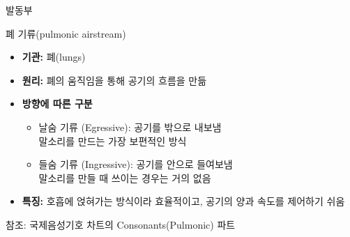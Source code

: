 \documentclass[11pt, aspectratio=169]{beamer}
\begin{document}
\begin{frame}[t]{발동부}
    \begin{block}{폐 기류(pulmonic airstream)}
        \begin{itemize}
            \item \textbf{기관:} 폐(lungs)
            \item \textbf{원리:} 폐의 움직임을 통해 공기의 흐름을 만듦
            \item \textbf{방향에 따른 구분}
                \begin{itemize}
                    \item 날숨 기류 (Egressive): 공기를 밖으로 내보냄 \\ \rightarrow 말소리를 만드는 가장 보편적인 방식
                    \item 들숨 기류 (Ingressive): 공기를 안으로 들여보냄 \\ \rightarrow 말소리를 만들 때 쓰이는 경우는 거의 없음
                \end{itemize}
            \item \textbf{특징:} 호흡에 얹혀가는 방식이라 효율적이고, 공기의 양과 속도를 제어하기 쉬움
        \end{itemize}
    \end{block}
    참조: 국제음성기호 차트의 Consonants(Pulmonic) 파트
\end{frame}
\end{document}

